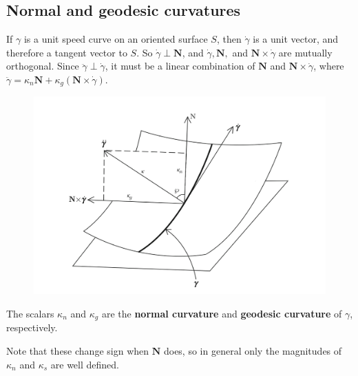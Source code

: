 \subsection{Normal and geodesic curvatures}
If $\gamma $ is a unit speed curve on an oriented surface $S$, then $\dot \gamma $ is a unit vector, and therefore a tangent vector to $S$. So $\dot \gamma \perp \mathbf N$, and $\dot \gamma ,\mathbf N,$ and $\mathbf N\times \dot \gamma $ are mutually orthogonal. Since $\ddot \gamma \perp \dot \gamma $, it must be a linear combination of $\mathbf N$ and $\mathbf N\times \dot \gamma $, where $\ddot \gamma =\kappa_n \mathbf N+\kappa_g(\mathbf N\times \dot\gamma) $.
\begin{figure}[H]
\centering
 \includegraphics[width=0.65\linewidth]{figures/dgeo_4.1.png}
\end{figure}
\begin{definition}[]
    The scalars $\kappa_n $ and $\kappa_g$ are the \textbf{normal curvature} and \textbf{geodesic curvature} of $\gamma $, respectively.
\end{definition}
Note that these change sign when $\mathbf N$ does, so in general only the magnitudes of $\kappa_n $ and $\kappa_s$ are well defined.

